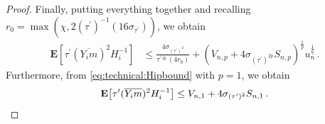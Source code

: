 \documentclass[10pt,a4paper]{amsart}
\newcommand{\E}{\mathbf{E}} %
\newcommand{\EOf}[1]{\E\abOf{#1}}
\newcommand{\ab}[1]{\lab #1 \rab} %
\newcommand{\abOf}[1]{\!\ab{#1}} %
\newcommand{\br}[1]{\lb #1 \rb} %
\newcommand{\brOf}[1]{\!\br{#1}} %
\newcommand{\ddrtran}{\tau^{\prime\oplus}}
\newcommand{\dtran}{\tau\pr}
\newcommand{\eqfs}{\,.}
\newcommand{\invdtran}{(\tau\pr)^{-1}}
\newcommand{\lab}{\left[} %
\newcommand{\lb}{\left(} %
\newcommand{\ol}[2]{\overline{#1#2}}
\newcommand{\pr}{^\prime}
\newcommand{\rab}{\right]} %
\newcommand{\rb}{\right)} %
\begin{document}
\begin{proof}
    Finally, putting everything together and recalling $r_0 = \max\brOf{\chi, 2 \invdtran\brOf{16 \sigma_{\dtran}}}$, we obtain
    \begin{align}
        \EOf{\dtran(\ol{Y_i}m)^2 H_i^{-1}}
        &\leq
        \frac{4 \sigma_{(\dtran)^2}}{\ddrtran(4r_0)}
        +
        \br{V_{n,p} + 4 \sigma_{(\dtran)^{2p}} S_{n,p}}^{\frac1p} u_n^{\frac1q}
        \eqfs
    \end{align}
    Furthermore, from \eqref{eq:technical:Hipbound} with $p = 1$, we obtain
    \begin{equation}
        \EOf{\dtran(\ol{Y_i}m)^2 H_i^{-1}}
        \leq 
        V_{n,1} + 4 \sigma_{(\dtran)^{2}} S_{n,1}
        \eqfs
        \qedhere
    \end{equation}
\end{proof}
\end{document}
